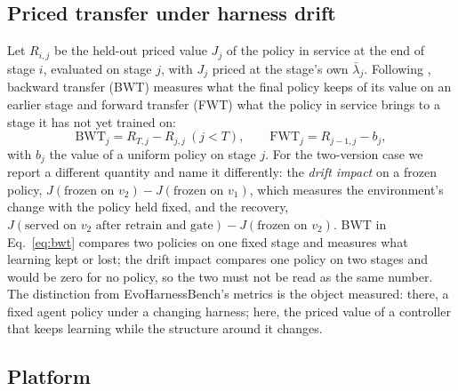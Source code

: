 \documentclass[10pt]{article}
\begin{document}
\subsection{Priced transfer under harness drift}
\label{sec:transfer}

Let $R_{i,j}$ be the held-out priced value $J_j$ of the policy in service at the end of stage $i$, evaluated on stage $j$, with $J_j$ priced at the stage's own $\bar\lambda_j$. Following \citet{lopezpaz2017gem}, backward transfer (BWT) measures what the final policy keeps of its value on an earlier stage and forward transfer (FWT) what the policy in service brings to a stage it has not yet trained on:
\begin{equation}
\mathrm{BWT}_j=R_{T,j}-R_{j,j}\ (j<T),\qquad
\mathrm{FWT}_j=R_{j-1,j}-b_j,
\label{eq:bwt}
\end{equation}
with $b_j$ the value of a uniform policy on stage $j$. For the two-version case we report a different quantity and name it differently: the \emph{drift impact} on a frozen policy, $J(\text{frozen on }v_2)-J(\text{frozen on }v_1)$, which measures the environment's change with the policy held fixed, and the recovery, $J(\text{served on }v_2\text{ after retrain and gate})-J(\text{frozen on }v_2)$. BWT in Eq.~\eqref{eq:bwt} compares two policies on one fixed stage and measures what learning kept or lost; the drift impact compares one policy on two stages and would be zero for no policy, so the two must not be read as the same number. The distinction from EvoHarnessBench's metrics is the object measured: there, a fixed agent policy under a changing harness; here, the priced value of a controller that keeps learning while the structure around it changes.

\subsection{Platform}
\label{sec:platform}
\end{document}
